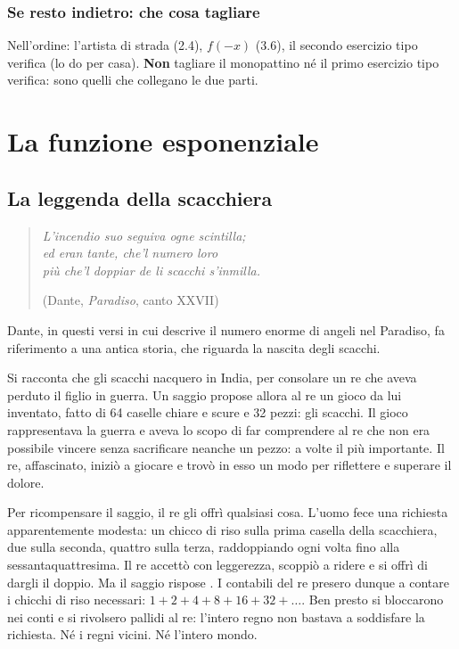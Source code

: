 \documentclass[11pt]{report}
\begin{document}
\subsection*{Se resto indietro: che cosa tagliare}
Nell'ordine: l'artista di strada (2.4), $f(-x)$ (3.6), il secondo esercizio tipo verifica (lo do per casa). \textbf{Non} tagliare il monopattino né il primo esercizio tipo verifica: sono quelli che collegano le due parti.

\chapter{La funzione esponenziale}

\section{La leggenda della scacchiera}

\begin{quote}\itshape
L'incendio suo seguiva ogne scintilla;\\
ed eran tante, che'l numero loro\\
più che'l doppiar de li scacchi s'inmilla.
\begin{flushright}\upshape (Dante, \emph{Paradiso}, canto XXVII)\end{flushright}
\end{quote}

Dante, in questi versi in cui descrive il numero enorme di angeli nel Paradiso, fa riferimento a una antica storia, che riguarda la nascita degli scacchi.

Si racconta che gli scacchi nacquero in India, per consolare un re che aveva perduto il figlio in guerra. Un saggio propose allora al re un gioco da lui inventato, fatto di 64 caselle chiare e scure e 32 pezzi: gli scacchi. Il gioco rappresentava la guerra e aveva lo scopo di far comprendere al re che non era possibile vincere senza sacrificare neanche un pezzo: a volte il più importante. Il re, affascinato, iniziò a giocare e trovò in esso un modo per riflettere e superare il dolore.

Per ricompensare il saggio, il re gli offrì qualsiasi cosa. L'uomo fece una richiesta apparentemente modesta: un chicco di riso sulla prima casella della scacchiera, due sulla seconda, quattro sulla terza, raddoppiando ogni volta fino alla sessantaquattresima.
Il re accettò con leggerezza, scoppiò a ridere e si offrì di dargli il doppio. Ma il saggio rispose . I contabili del re presero dunque a contare i chicchi di riso necessari: $1+2+4+8+16+32+\dots$. Ben presto si bloccarono nei conti e si rivolsero pallidi al re: l'intero regno non bastava a soddisfare la richiesta. Né i regni vicini. Né l'intero mondo.
\end{document}
